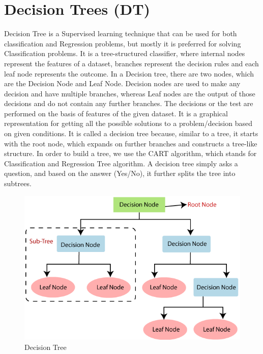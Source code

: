 \documentclass[12pt,a4paper]{report}
\begin{document}
\chapter{Decision Trees (DT)}
Decision Tree is a Supervised learning technique that can be used for both classification and Regression problems, but mostly it is preferred for solving Classification problems. It is a tree-structured classifier, where internal nodes represent the features of a dataset, branches represent the decision rules and each leaf node represents the outcome.
In a Decision tree, there are two nodes, which are the Decision Node and Leaf Node. Decision nodes are used to make any decision and have multiple branches, whereas Leaf nodes are the output of those decisions and do not contain any further branches.
The decisions or the test are performed on the basis of features of the given dataset.
It is a graphical representation for getting all the possible solutions to a problem/decision based on given conditions.
It is called a decision tree because, similar to a tree, it starts with the root node, which expands on further branches and constructs a tree-like structure.
In order to build a tree, we use the CART algorithm, which stands for Classification and Regression Tree algorithm.
A decision tree simply asks a question, and based on the answer (Yes/No), it further splits the tree into subtrees. \cite{javatpoint_dt}

\begin{figure}[htbp]
    \centering
    \includegraphics[width=\textwidth]{decision-tree-classification-algorithm.png}
    \caption{Decision Tree}
    \label{fig:decision-tree}
\end{figure}
\end{document}
